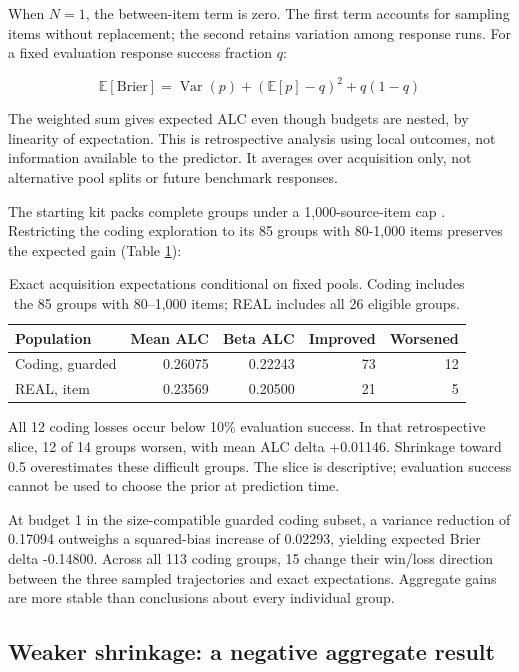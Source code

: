 \documentclass{article}
\begin{document}
When \(N=1\), the between-item term is zero. The first term accounts for sampling items without replacement; the second retains variation among response runs. For a fixed evaluation response success fraction \(q\):

\begin{equation}
\mathbb{E}[\mathrm{Brier}]=\operatorname{Var}(p)+(\mathbb{E}[p]-q)^2+q(1-q)
\end{equation}

The weighted sum gives expected ALC even though budgets are nested, by linearity of expectation. This is retrospective analysis using local outcomes, not information available to the predictor. It averages over acquisition only, not alternative pool splits or future benchmark responses.

The starting kit packs complete groups under a 1,000-source-item cap \cite{ref4}. Restricting the coding exploration to its 85 groups with 80-1,000 items preserves the expected gain (Table \ref{tab:expected}):

\begin{table}[ht]
\centering
\caption{Exact acquisition expectations conditional on fixed pools. Coding includes the 85 groups with 80--1,000 items; REAL includes all 26 eligible groups.}
\label{tab:expected}
\begin{tabular}{lrrrr}
\toprule
Population & Mean ALC & Beta ALC & Improved & Worsened \\
\midrule
Coding, guarded & 0.26075 & 0.22243 & 73 & 12 \\
REAL, item & 0.23569 & 0.20500 & 21 & 5 \\
\bottomrule
\end{tabular}
\end{table}

All 12 coding losses occur below 10\% evaluation success. In that retrospective slice, 12 of 14 groups worsen, with mean ALC delta +0.01146. Shrinkage toward 0.5 overestimates these difficult groups. The slice is descriptive; evaluation success cannot be used to choose the prior at prediction time.

At budget 1 in the size-compatible guarded coding subset, a variance reduction of 0.17094 outweighs a squared-bias increase of 0.02293, yielding expected Brier delta -0.14800. Across all 113 coding groups, 15 change their win/loss direction between the three sampled trajectories and exact expectations. Aggregate gains are more stable than conclusions about every individual group.

\subsection{Weaker shrinkage: a negative aggregate result}\label{weaker-shrinkage-a-negative-aggregate-result}
\end{document}
